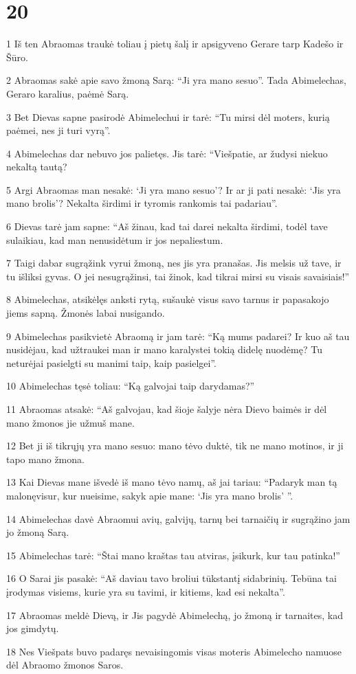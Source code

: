 \chapter{20}

\par 1 Iš ten Abraomas traukė toliau į pietų šalį ir apsigyveno Gerare tarp Kadešo ir Šūro. 
\par 2 Abraomas sakė apie savo žmoną Sarą: “Ji yra mano sesuo”. Tada Abimelechas, Geraro karalius, paėmė Sarą. 
\par 3 Bet Dievas sapne pasirodė Abimelechui ir tarė: “Tu mirsi dėl moters, kurią paėmei, nes ji turi vyrą”. 
\par 4 Abimelechas dar nebuvo jos palietęs. Jis tarė: “Viešpatie, ar žudysi niekuo nekaltą tautą? 
\par 5 Argi Abraomas man nesakė: ‘Ji yra mano sesuo’? Ir ar ji pati nesakė: ‘Jis yra mano brolis’? Nekalta širdimi ir tyromis rankomis tai padariau”. 
\par 6 Dievas tarė jam sapne: “Aš žinau, kad tai darei nekalta širdimi, todėl tave sulaikiau, kad man nenusidėtum ir jos nepaliestum. 
\par 7 Taigi dabar sugrąžink vyrui žmoną, nes jis yra pranašas. Jis melsis už tave, ir tu išliksi gyvas. O jei nesugrąžinsi, tai žinok, kad tikrai mirsi su visais savaisiais!” 
\par 8 Abimelechas, atsikėlęs anksti rytą, sušaukė visus savo tarnus ir papasakojo jiems sapną. Žmonės labai nusigando. 
\par 9 Abimelechas pasikvietė Abraomą ir jam tarė: “Ką mums padarei? Ir kuo aš tau nusidėjau, kad užtraukei man ir mano karalystei tokią didelę nuodėmę? Tu neturėjai pasielgti su manimi taip, kaip pasielgei”. 
\par 10 Abimelechas tęsė toliau: “Ką galvojai taip darydamas?” 
\par 11 Abraomas atsakė: “Aš galvojau, kad šioje šalyje nėra Dievo baimės ir dėl mano žmonos jie užmuš mane. 
\par 12 Bet ji iš tikrųjų yra mano sesuo: mano tėvo duktė, tik ne mano motinos, ir ji tapo mano žmona. 
\par 13 Kai Dievas mane išvedė iš mano tėvo namų, aš jai tariau: “Padaryk man tą malonę­visur, kur nueisime, sakyk apie mane: ‘Jis yra mano brolis’ ”. 
\par 14 Abimelechas davė Abraomui avių, galvijų, tarnų bei tarnaičių ir sugrąžino jam jo žmoną Sarą. 
\par 15 Abimelechas tarė: “Štai mano kraštas tau atviras, įsikurk, kur tau patinka!” 
\par 16 O Sarai jis pasakė: “Aš daviau tavo broliui tūkstantį sidabrinių. Tebūna tai įrodymas visiems, kurie yra su tavimi, ir kitiems, kad esi nekalta”. 
\par 17 Abraomas meldė Dievą, ir Jis pagydė Abimelechą, jo žmoną ir tarnaites, kad jos gimdytų. 
\par 18 Nes Viešpats buvo padaręs nevaisingomis visas moteris Abimelecho namuose dėl Abraomo žmonos Saros.



